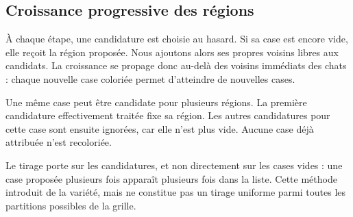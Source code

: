 \documentclass[11pt,a4paper]{article}
\begin{document}
\subsection{Croissance progressive des régions}

À chaque étape, une candidature est choisie au hasard. Si sa case est
encore vide, elle reçoit la région proposée. Nous ajoutons alors ses
propres voisins libres aux candidats. La croissance se propage donc
au-delà des voisins immédiats des chats : chaque nouvelle case coloriée
permet d'atteindre de nouvelles cases.

Une même case peut être candidate pour plusieurs régions. La première
candidature effectivement traitée fixe sa région. Les autres candidatures
pour cette case sont ensuite ignorées, car elle n'est plus vide.
Aucune case déjà attribuée n'est recoloriée.

Le tirage porte sur les candidatures, et non directement sur les cases
vides : une case proposée plusieurs fois apparaît plusieurs fois dans
la liste. Cette méthode introduit de la variété, mais ne constitue pas
un tirage uniforme parmi toutes les partitions possibles de la grille.
\end{document}
